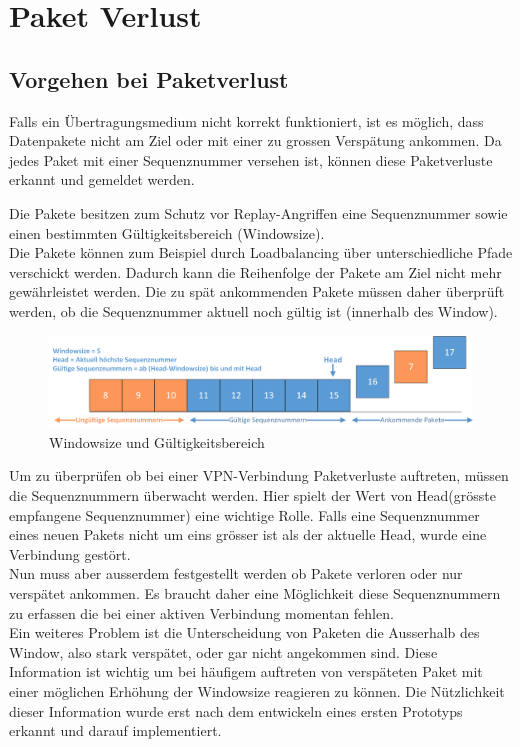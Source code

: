 \section{Paket Verlust}
\label{sec:Paket Verlust}

\subsection{Vorgehen bei Paketverlust}

Falls ein Übertragungsmedium nicht korrekt funktioniert, ist es möglich, dass Datenpakete nicht am Ziel oder mit einer zu grossen Verspätung ankommen.
Da jedes \esp{} Paket mit einer Sequenznummer versehen ist, können diese Paketverluste erkannt und gemeldet werden.

Die \esp{} Pakete besitzen zum Schutz vor Replay-Angriffen eine Sequenznummer sowie einen bestimmten Gültigkeitsbereich (Windowsize).\\
Die Pakete können zum Beispiel durch Loadbalancing \"{u}ber unterschiedliche Pfade verschickt werden. Dadurch kann die Reihenfolge der Pakete am Ziel nicht mehr gewährleistet werden. Die zu spät ankommenden Pakete müssen daher überprüft werden, ob die Sequenznummer aktuell noch gültig ist (innerhalb des Window).

\begin{figure}[H]
    \begin{center}
        \includegraphics[trim=1 0 0 0,clip,width=\textwidth]{start/img/Sequenznummern.png}
    \end{center}
    \caption{Windowsize und Gültigkeitsbereich}
\end{figure}

Um zu überprüfen ob bei einer VPN-Verbindung Paketverluste auftreten, müssen die Sequenznummern überwacht werden. Hier spielt der Wert von Head(grösste empfangene Sequenznummer) eine wichtige Rolle. Falls eine Sequenznummer eines neuen Pakets nicht um eins grösser ist als der aktuelle Head, wurde eine Verbindung gestört.\\
Nun muss aber ausserdem festgestellt werden ob Pakete verloren oder nur verspätet ankommen. Es braucht daher eine Möglichkeit diese Sequenznummern zu erfassen die bei einer aktiven Verbindung momentan fehlen.\\
Ein weiteres Problem ist die Unterscheidung von Paketen die Ausserhalb des Window, also stark verspätet, oder gar nicht angekommen sind. Diese Information ist wichtig um bei häufigem auftreten von verspäteten Paket mit einer möglichen Erhöhung der Windowsize reagieren zu können. Die Nützlichkeit dieser Information wurde erst nach dem entwickeln eines ersten Prototyps erkannt und darauf implementiert.


